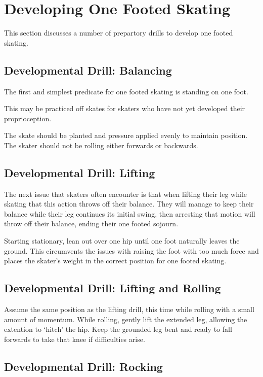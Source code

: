 \section{Developing One Footed Skating}
\label{sec:one_foot/development}


This section discusses a number of prepartory drills to develop one footed skating. 


\subsection*{Developmental Drill: Balancing}
The first and simplest predicate for one footed skating is standing on one foot. 

This may be practiced off skates for skaters who have not yet developed their proprioception.    

The skate should be planted and pressure applied evenly to maintain position.   
The skater should not be rolling either forwards or backwards.

\subsection*{Developmental Drill: Lifting}
The next issue that skaters often encounter is that when lifting their leg while skating that this action throws off their balance.
They will manage to keep their balance while their leg continues its initial swing, then arresting that motion will throw off their balance, ending their one footed sojourn.  


Starting stationary, lean out over one hip until one foot naturally leaves the ground.
This circumvents the issues with raising the foot with too much force and places the skater's weight in the correct position for one footed skating.    


\subsection*{Developmental Drill: Lifting and Rolling}
 

Assume the same position as the lifting drill, this time while rolling with a small amount of momentum. 
While rolling, gently lift the extended leg, allowing the extention to `hitch' the hip.
Keep the grounded leg bent and ready to fall forwards to take that knee if difficulties arise.  


\subsection*{Developmental Drill: Rocking}

